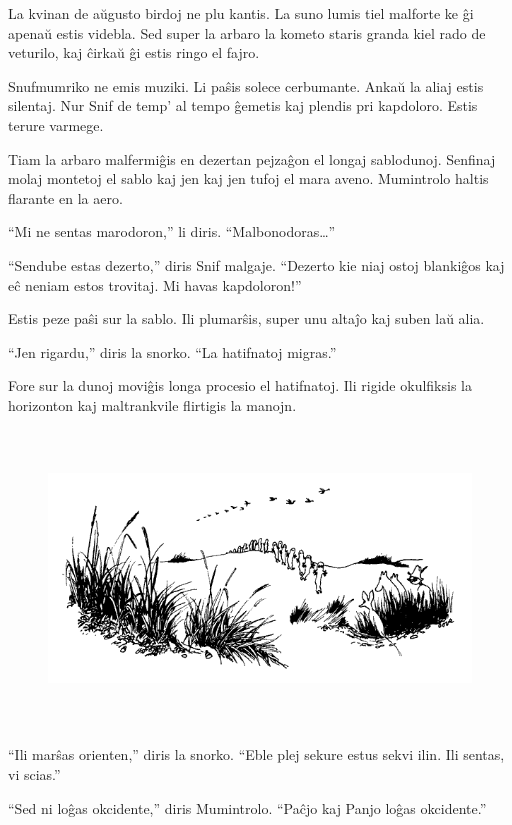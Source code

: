 La kvinan de aŭgusto birdoj ne plu kantis. La suno lumis tiel malforte ke ĝi apenaŭ estis videbla. Sed super la arbaro la kometo staris granda kiel rado de veturilo, kaj ĉirkaŭ ĝi estis ringo el fajro.

Snufmumriko ne emis muziki. Li paŝis solece cerbumante. Ankaŭ la aliaj estis silentaj. Nur Snif de temp' al tempo ĝemetis kaj plendis pri kapdoloro. Estis terure varmege.

Tiam la arbaro malfermiĝis en dezertan pejzaĝon el longaj sablodunoj. Senfinaj molaj montetoj el sablo kaj jen kaj jen tufoj el mara aveno. Mumintrolo haltis flarante en la aero.

``Mi ne sentas marodoron,'' li diris. ``Malbonodoras{\ldots}''

``Sendube estas dezerto,'' diris Snif malgaje. ``Dezerto kie niaj ostoj blankiĝos kaj eĉ neniam estos trovitaj. Mi havas kapdoloron!''

Estis peze paŝi sur la sablo. Ili plumarŝis, super unu altaĵo kaj suben laŭ alia.

``Jen rigardu,'' diris la snorko. ``La hatifnatoj migras.''

Fore sur la dunoj moviĝis longa procesio el hatifnatoj. Ili rigide okulfiksis la horizonton kaj maltrankvile flirtigis la manojn.

\begin{figure}[htbp]
\centering
\includegraphics[width=449pt,height=223pt]{7-1.png}
\caption{}
\label{7-1}
\end{figure}

``Ili marŝas orienten,'' diris la snorko. ``Eble plej sekure estus sekvi ilin. Ili sentas, vi scias.''

``Sed ni loĝas okcidente,'' diris Mumintrolo. ``Paĉjo kaj Panjo loĝas okcidente.''

